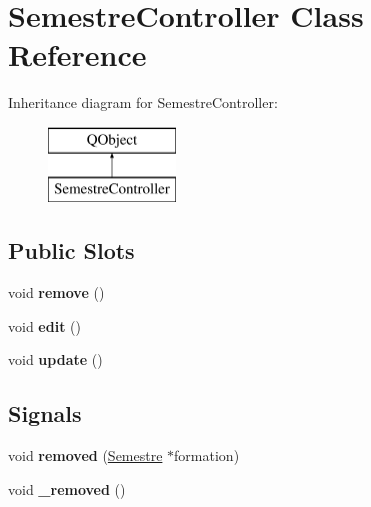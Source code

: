 \hypertarget{classSemestreController}{\section{Semestre\+Controller Class Reference}
\label{classSemestreController}
}
Inheritance diagram for Semestre\+Controller\+:\begin{figure}[H]
\begin{center}
\leavevmode
\includegraphics[height=2.000000cm]{classSemestreController}
\end{center}
\end{figure}
\subsection*{Public Slots}
\begin{DoxyCompactItemize}
\item 
\hypertarget{classSemestreController_a1bf45d14d271656c9757928365bb265a}{void {\bfseries remove} ()}\label{classSemestreController_a1bf45d14d271656c9757928365bb265a}

\item 
\hypertarget{classSemestreController_aa39c752c66b547f2416aad35927f7e4c}{void {\bfseries edit} ()}\label{classSemestreController_aa39c752c66b547f2416aad35927f7e4c}

\item 
\hypertarget{classSemestreController_a0667966f3c30e4e9860cd698ddced399}{void {\bfseries update} ()}\label{classSemestreController_a0667966f3c30e4e9860cd698ddced399}

\end{DoxyCompactItemize}
\subsection*{Signals}
\begin{DoxyCompactItemize}
\item 
\hypertarget{classSemestreController_a0b70f5ed336d6332b909583e2ce7dbdf}{void {\bfseries removed} (\hyperlink{classSemestre}{Semestre} $\ast$formation)}\label{classSemestreController_a0b70f5ed336d6332b909583e2ce7dbdf}

\item 
\hypertarget{classSemestreController_adee6430a8ff41583d14ae5a7add99512}{void {\bfseries \+\_\+removed} ()}\label{classSemestreController_adee6430a8ff41583d14ae5a7add99512}

\end{DoxyCompactItemize}
